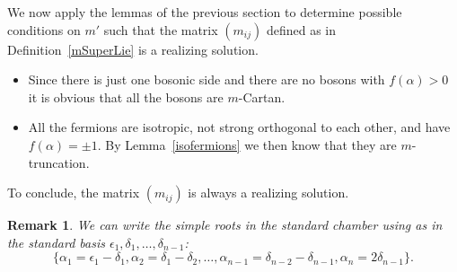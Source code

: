 \documentclass[pdftex]{sigma}%
\numberwithin{equation}{section}
\newtheorem{oss}[teo]{Remark} }
\begin{document}
We now apply the lemmas of the previous section to determine possible conditions on $m'$ such that the matrix $(m_{ij})$ defined as in Definition~\ref{mSuperLie} is a realizing solution.
\begin{itemize}\itemsep=0pt
	\item Since there is just one bosonic side and there are no bosons with $f(\alpha)>0$ it is obvious that all the bosons are $m$-Cartan.
	\item All the fermions are isotropic, not strong orthogonal to each other, and have $f(\alpha)= \pm 1$. By Lemma~\ref{isofermions} we then know that they are $m$-truncation.
\end{itemize}
To conclude, the matrix $(m_{ij})$ is always a realizing solution.

\begin{oss} We can write the simple roots in the standard chamber using as in \cite{Kac77} the standard basis $\epsilon_1, \delta_ 1, \dots, \delta_{n-1}$:
\[  \lbrace \alpha_1 = \epsilon_1-\delta_1,  \alpha_2= \delta_1-\delta_2, \dots, \alpha_{n-1}=\delta_{n-2}-\delta_{n-1},  \alpha_n= 2\delta_{n-1} \rbrace. \]
\end{oss}
\end{document}
